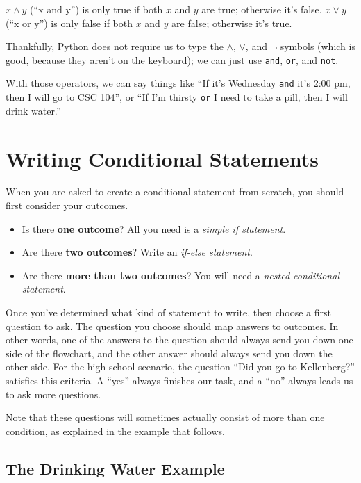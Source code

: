$x \land y$ (``x and y'') is only true if both $x$ and $y$ are true; otherwise it's false.  $x \lor y$ (``x or y'') is only false if both $x$ and $y$ are false; otherwise it's true.

Thankfully, Python does not require us to type the $\land$, $\lor$, and $\lnot$ symbols (which is good, because they aren't on the keyboard); we can just use \texttt{and}, \texttt{or}, and \texttt{not}.

With those operators, we can say things like ``If it's Wednesday \texttt{and} it's 2:00 pm, then I will go to CSC 104'', or ``If I'm thirsty \texttt{or} I need to take a pill, then I will drink water.''

\section{Writing Conditional Statements}

When you are asked to create a conditional statement from scratch, you should first consider your outcomes.

\begin{itemize}
    \item Is there \textbf{one outcome}?  All you need is a \textit{simple if statement}.
    \item Are there \textbf{two outcomes}?  Write an \textit{if-else statement}.
    \item Are there \textbf{more than two outcomes}?  You will need a \textit{nested conditional statement}.
\end{itemize}

Once you've determined what kind of statement to write, then choose a first question to ask.  The question you choose should map answers to outcomes.  In other words, one of the answers to the question should always send you down one side of the flowchart, and the other answer should always send you down the other side.  For the high school scenario, the question ``Did you go to Kellenberg?'' satisfies this criteria.  A ``yes'' always finishes our task, and a ``no'' always leads us to ask more questions.

Note that these questions will sometimes actually consist of more than one condition, as explained in the example that follows.

\subsection{The Drinking Water Example}

